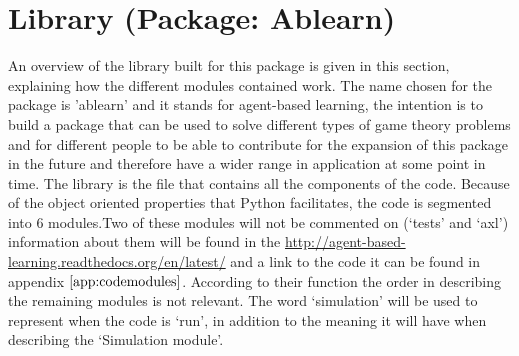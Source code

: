 \section{Library (Package: Ablearn)}\label{library_section}
An overview of the library built for this package is given in this section, explaining how the different modules contained work. The name chosen for the package is 'ablearn' and it stands for agent-based learning, the intention is to build a package that can be used to solve different types of game theory problems and for different people to be able to contribute for the expansion of this package in the future and therefore have a wider range in application at some point in time.
The library is the file that contains all the components of the code. Because of the object oriented properties that Python facilitates, the code is segmented into 6 modules.Two of these modules will not be commented on (`tests' and `axl')  information about them will be found in the \url{http://agent-based-learning.readthedocs.org/en/latest/} and a link to the code it can be found in appendix $\ref{app:codemodules}$. According to their function the order in describing the remaining modules is not relevant. The word `simulation' will be used to represent when the code is `run', in addition to the meaning it will have when describing the `Simulation module'.

